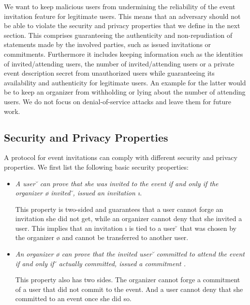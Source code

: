 We want to keep malicious users from undermining the reliability of the
event invitation feature for legitimate users. This means that an
adversary should not be able to violate the security and privacy
properties that we define in the next section. 
This comprises guaranteeing the authenticity and non-repudiation of
statements made by the involved parties, such as issued invitations or
commitments. 
Furthermore it includes keeping information such as the identities of
invited/attending users, the number of invited/attending users or a
private event description secret from unauthorized users while
guaranteeing its availability and authenticity for legitimate users.
An example for the latter would be to keep an organizer 
from withholding or lying about the number of attending users.
%
We do not focus on denial-of-service attacks and leave
them for future work.

\subsection{Security and Privacy Properties}
	\label{subsection:event-invitations-dosns:security-properties}
A protocol for event invitations can comply with different security and
privacy properties. We first list the following basic security properties:

\begin{itemize}
	
	\item \textit{A user \u{} can prove that she was invited to the
					event \e{} if and only if the organizer
					\o{} invited \u{}, \ie issued an
					invitation \i{}.} 

	This property is two-sided and guarantees that a user cannot forge
	an invitation she did not get, while an organizer cannot deny that
	she invited a user. 
	This implies that an invitation \i{} is tied to a user \u{} that was
	chosen by the organizer \o{} and cannot be transferred to another user.\\

	
	\item \textit{An organizer \o{} can prove that the invited 
		user \u{} committed to attend the event \e{} if and only if \u{}
		actually committed, \ie issued a commitment \cm{}.}

	This property also has two sides. The organizer cannot forge a commitment
	of a user that did not commit to the event. And a user cannot deny
	that she committed to an event once she did so.

\end{itemize}


